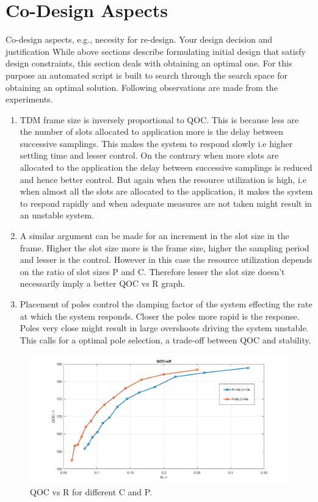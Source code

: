 \section{Co-Design Aspects}
\color{red}
Co-design	aspects,	e.g.,	necesity for	re-design.	Your	design	decision	and	justification
\color{black}
While above sections describe formulating initial design that satisfy design constraints, this section deals with obtaining an optimal one. For this purpose an automated script is built to search through the search space for obtaining an optimal solution. Following observations are made from the experiments.

\begin{enumerate}
	\item TDM frame size is inversely proportional to QOC. This is because less are the number of slots allocated to application more is the delay between successive samplings. This makes the system to respond slowly i.e higher settling time and lesser control. On the contrary when more slots are allocated to the application the delay between successive samplings is reduced and hence better control. But again when the resource utilization is high, i.e when almost all the slots are allocated to the application, it makes the system to respond rapidly and when adequate measures are not taken might result in an unstable system.
	
	\item A similar argument can be made for an increment in the slot size in the frame. Higher the slot size more is the frame size, higher the sampling period and lesser is the control. However in this case the resource utilization depends on the ratio of slot sizes P and C. Therefore lesser the slot size  doesn't necessarily imply a better QOC vs R graph.
	
	\item Placement of poles control the damping factor of the system effecting the rate at which the system responds. Closer the poles more rapid is the response. Poles very close might result in large overshoots driving the system unstable. This calls for a optimal pole selection, a trade-off between QOC and stability.
\end{enumerate}

\begin{figure}[h]
	\begin{center}
		\includegraphics[width=\linewidth]{img/qoc2}
		\caption{QOC vs R for different C and P.}
		\label{fig:qoc2}
	\end{center}
\end{figure}